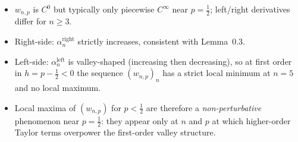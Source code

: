 \documentclass{article}
\theoremstyle{remark}
\begin{document}
\begin{itemize}
  \item $w_{n,p}$ is $C^{0}$ but typically only piecewise $C^{\infty}$
  near $p=\tfrac12$; left/right derivatives differ for $n\ge3$.
  \item Right-side: $\alpha_{n}^{\text{right}}$ strictly increases,
  consistent with Lemma~0.3.
  \item Left-side: $\alpha_{n}^{\text{left}}$ is valley-shaped
  (increasing then decreasing), so at first order in $h=p-\tfrac12<0$ the
  sequence $(w_{n,p})_{n}$ has a strict local minimum at $n=5$ and no
  local maximum.
  \item Local maxima of $(w_{n,p})$ for $p<\tfrac12$ are therefore a
  \emph{non-perturbative} phenomenon near $p=\tfrac12$: they appear only
  at $n$ and $p$ at which higher-order Taylor terms overpower the
  first-order valley structure.
\end{itemize}
\end{document}
